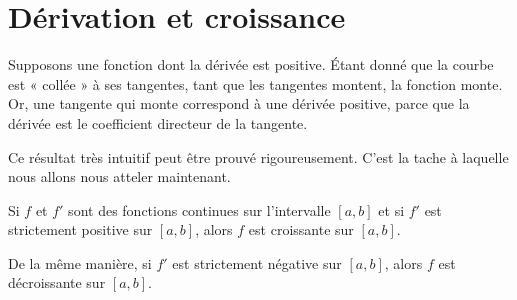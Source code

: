 
\section{Dérivation et croissance}

Supposons une fonction dont la dérivée est positive. Étant donné que la courbe est « collée » à ses tangentes, tant que les tangentes montent, la fonction monte. Or, une tangente qui monte correspond à une dérivée positive, parce que la dérivée est le coefficient directeur de la tangente.

Ce résultat très intuitif peut être prouvé rigoureusement. C'est la tache à laquelle nous allons nous atteler maintenant.

\begin{proposition} \label{PropGFkZMwD}
    Si $f$ et $f'$ sont des fonctions continues sur l'intervalle $[a,b]$ et si $f'$ est strictement positive sur $[a,b]$, alors $f$ est croissante sur $[a,b]$.

    De la même manière, si $f'$ est strictement négative sur $[a,b]$, alors $f$ est décroissante sur $[a,b]$.
\end{proposition}

